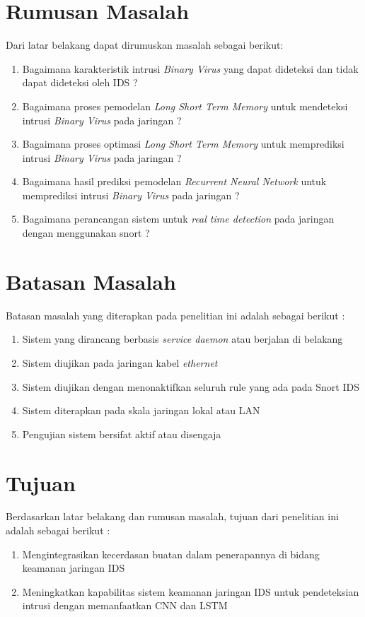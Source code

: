 \documentclass[./skripsi.tex]{subfiles}
\begin{document}
\section{Rumusan Masalah}
Dari latar belakang dapat dirumuskan masalah sebagai berikut:
\begin{enumerate}
    \item Bagaimana karakteristik intrusi \textit{Binary Virus} yang dapat dideteksi dan tidak dapat dideteksi oleh IDS ?
    \item Bagaimana proses pemodelan \textit{Long Short Term Memory} untuk mendeteksi intrusi \textit{Binary Virus} pada jaringan ?
    \item Bagaimana proses optimasi \textit{Long Short Term Memory} untuk memprediksi intrusi \textit{Binary Virus} pada jaringan ?
    \item Bagaimana hasil prediksi pemodelan \textit{Recurrent Neural Network} untuk memprediksi intrusi \textit{Binary Virus} pada jaringan ?
    \item Bagaimana perancangan sistem untuk \textit{real time detection} pada jaringan dengan menggunakan snort ?
\end{enumerate}
\section{Batasan Masalah}
Batasan masalah yang diterapkan pada penelitian ini adalah sebagai berikut :
\begin{enumerate}
    \item Sistem yang dirancang berbasis \textit{service daemon} atau berjalan di belakang
    \item Sistem diujikan pada jaringan kabel \textit{ethernet}
    \item Sistem diujikan dengan menonaktifkan seluruh rule yang ada pada Snort IDS
    \item Sistem diterapkan pada skala jaringan lokal atau LAN
    \item Pengujian sistem bersifat aktif atau disengaja
\end{enumerate}
\section{Tujuan}
Berdasarkan latar belakang dan rumusan masalah, tujuan dari penelitian ini adalah sebagai berikut :
\begin{enumerate}
    \item Mengintegrasikan kecerdasan buatan dalam penerapannya di bidang keamanan jaringan IDS
    \item Meningkatkan kapabilitas sistem keamanan jaringan IDS untuk pendeteksian intrusi dengan memanfaatkan CNN dan LSTM
\end{enumerate}
\end{document}
